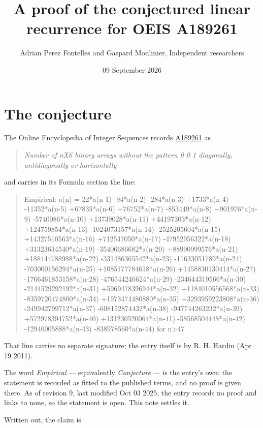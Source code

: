 \documentclass[11pt]{article}
\title{A proof of the conjectured linear recurrence for OEIS A189261}
\author{Adrian Perez Fontelles and Gaspard Moulinier, Independent researchers}
\date{09 September 2026}
\theoremstyle{definition}
\begin{document}
\maketitle
\section{The conjecture}

The Online Encyclopedia of Integer Sequences records \href{https://oeis.org/A189261}{A189261} as

\begin{quote}\itshape Number of nX6 binary arrays without the pattern 0 0 1 diagonally, antidiagonally or horizontally\end{quote}

and carries in its Formula section the line:

\begin{quote}\ttfamily Empirical: a(n) = 22*a(n-1) -94*a(n-2) -284*a(n-3) +1733*a(n-4) -11352*a(n-5) +67835*a(n-6) +76752*a(n-7) -853449*a(n-8) +901976*a(n-9) -5740086*a(n-10) +13739028*a(n-11) +44197303*a(n-12) +124759854*a(n-13) -1024073157*a(n-14) -2525205604*a(n-15) +14327510563*a(n-16) +712547050*a(n-17) -47952956322*a(n-18) +31323634540*a(n-19) -35406686682*a(n-20) +88990999576*a(n-21) +188444788988*a(n-22) -331486365542*a(n-23) -11633051789*a(n-24) -703000156294*a(n-25) +1085177784618*a(n-26) +1458830130414*a(n-27) -1766461853158*a(n-28) -476544246624*a(n-29) -234644319566*a(n-30) -2144529292192*a(n-31) +5969478396944*a(n-32) +1184010556568*a(n-33) -8359720474800*a(n-34) +1973474480880*a(n-35) +3293959223808*a(n-36) -249942799712*a(n-37) -608152874432*a(n-38) -947744263232*a(n-39) +572978394752*a(n-40) +131230520064*a(n-41) -58568504448*a(n-42) -12940005888*a(n-43) -838978560*a(n-44) for n>47\end{quote}

That line carries no separate signature; the entry itself is by R. H. Hardin (Apr 19 2011).

The word {\itshape Empirical} --- equivalently {\itshape Conjecture} --- is the entry's own: the statement is recorded as fitted to the published terms, and no proof is given there. As of revision 9, last modified Oct 03 2025, the entry records no proof and links to none, so the statement is open. This note settles it.

Written out, the claim is
\end{document}
